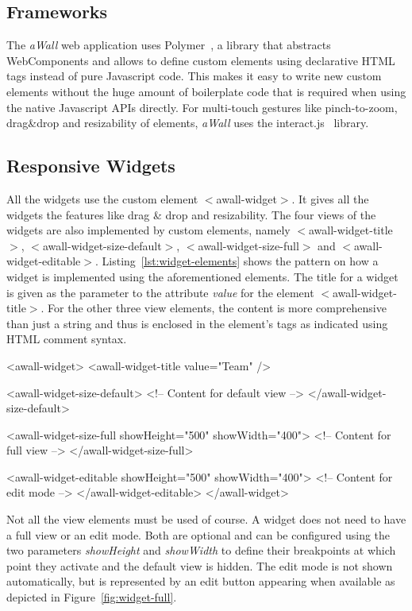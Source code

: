 \documentclass{sigchi}
\begin{document}
\subsection{Frameworks}
The \textit{aWall} web application uses Polymer~\cite{polymer}, a library that abstracts WebComponents and allows to define custom elements using declarative HTML tags instead of pure Javascript code.
This makes it easy to write new custom elements without the huge amount of boilerplate code that is required when using the native Javascript APIs directly.
For multi-touch gestures like pinch-to-zoom, drag\&drop and resizability of elements, \textit{aWall} uses the interact.js~\cite{interactJs} library.

\subsection{Responsive Widgets}
All the widgets use the custom element $<$awall-widget$>$.
It gives all the widgets the features like drag \& drop and resizability.
The four views of the widgets are also implemented by custom elements, namely $<$awall-widget-title$>$, $<$awall-widget-size-default$>$, $<$awall-widget-size-full$>$ and $<$awall-widget-editable$>$.
Listing~\ref{lst:widget-elements} shows the pattern on how a widget is implemented using the aforementioned elements.
The title for a widget is given as the parameter to the attribute \textit{value} for the element $<$awall-widget-title$>$.
For the other three view elements, the content is more comprehensive than just a string and thus is enclosed in the element's tags as indicated using HTML comment syntax.

\begin{code}[caption={HTML elements for the widget's different views.},label=lst:widget-elements]
<awall-widget>
  <awall-widget-title value="Team" />

  <awall-widget-size-default>
    <!-- Content for default view -->
  </awall-widget-size-default>

  <awall-widget-size-full showHeight="500" showWidth="400">
    <!-- Content for full view -->
  </awall-widget-size-full>

  <awall-widget-editable showHeight="500" showWidth="400">
    <!-- Content for edit mode -->
  </awall-widget-editable>
</awall-widget>
\end{code}

Not all the view elements must be used of course.
A widget does not need to have a full view or an edit mode.
Both are optional and can be configured using the two parameters \textit{showHeight} and \textit{showWidth} to define their breakpoints at which point they activate and the default view is hidden.
The edit mode is not shown automatically, but is represented by an edit button appearing when available as depicted in Figure~\ref{fig:widget-full}.
\end{document}
